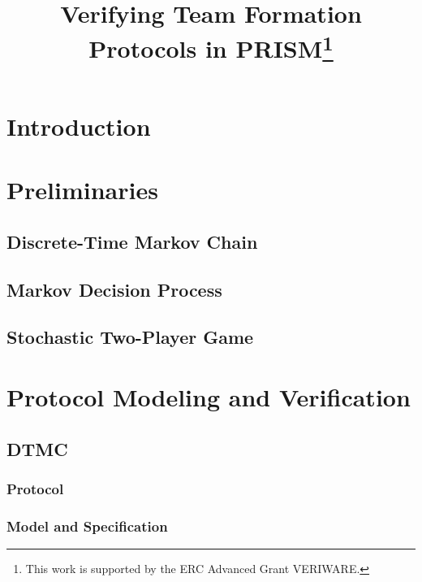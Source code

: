 \documentclass{llncs}
\begin{document}
\title{Verifying Team Formation Protocols in PRISM\thanks{This work is supported by
the ERC Advanced Grant VERIWARE.}}
\author{}
\email{}

\maketitle

\begin{abstract}

\end{abstract}

\section{Introduction}

 

\section{Preliminaries}

\subsection{Discrete-Time Markov Chain}
\subsection{Markov Decision Process}
\subsection{Stochastic Two-Player Game}

\section{Protocol Modeling and Verification}

\subsection{DTMC}
\subsubsection{Protocol}
\subsubsection{Model and Specification}
\end{document}
